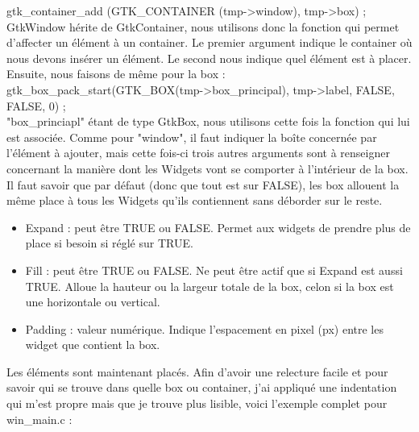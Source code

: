 \documentclass[11pt,french,a4paper]{report}
\begin{document}
 gtk\_container\_add (GTK\_CONTAINER (tmp->window), tmp->box) ; \\

GtkWindow hérite de GtkContainer, nous utilisons donc la fonction qui permet d'affecter un élément à un container. Le premier argument 
indique le container où nous devons insérer un élément. Le second nous indique quel élément est à placer. \\

Ensuite, nous faisons de même pour la box : \\

  gtk\_box\_pack\_start(GTK\_BOX(tmp->box\_principal), tmp->label, FALSE, FALSE, 0) ; \\

"box\_princiapl" étant de type GtkBox, nous utilisons cette fois la fonction qui lui est associée. 
Comme pour "window", il faut indiquer la boîte concernée par l'élément à ajouter, mais cette fois-ci trois autres arguments 
sont à renseigner concernant la manière dont les Widgets vont se comporter à l'intérieur de la box. \\ 

Il faut savoir que par défaut (donc que tout est sur FALSE), les box allouent la même place à tous les Widgets qu'ils contiennent
sans déborder sur le reste.\\

\begin{itemize}
    \item Expand : peut être TRUE ou FALSE. Permet aux widgets de prendre plus de place si besoin si réglé sur TRUE. \\ 
    \item Fill : peut être TRUE ou FALSE. Ne peut être actif que si Expand est aussi TRUE. Alloue la hauteur ou la largeur totale
        de la box, 
        celon si la box est une horizontale ou vertical. \\
    \item Padding : valeur numérique. Indique l'espacement en pixel (px) entre les widget que contient la box. \\ 
\end{itemize}

Les éléments sont maintenant placés. Afin d'avoir une relecture facile et pour savoir qui se trouve dans quelle box ou container, 
j'ai appliqué une indentation  qui m'est propre mais que je trouve plus lisible, voici l'exemple complet pour win\_main.c : \\

\end{document}
